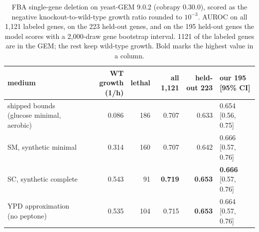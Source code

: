 \begin{table}[H]
  \centering
  \footnotesize
  \caption[FBA essentiality by medium]{FBA single-gene deletion on yeast-GEM 9.0.2 (cobrapy 0.30.0), scored as the negative knockout-to-wild-type growth ratio rounded to $10^{-3}$. AUROC on all 1,121 labeled genes, on the 223 held-out genes, and on the 195 held-out genes the model scores with a 2,000-draw gene bootstrap interval. 1121 of the labeled genes are in the GEM; the rest keep wild-type growth. Bold marks the highest value in a column.}
  \label{tab:fba-media}
  \begin{tabular}{@{}lrrrrl@{}}
    \hline
    medium & WT growth (1/h) & lethal & all 1,121 & held-out 223 & our 195 [95\% CI] \\
    \hline
    shipped bounds (glucose minimal, aerobic) & 0.086 & 186 & 0.707 & 0.633 & 0.654 [0.56, 0.75] \\
    SM, synthetic minimal & 0.314 & 160 & 0.707 & 0.642 & 0.666 [0.57, 0.76] \\
    SC, synthetic complete & 0.543 & 91 & \textbf{0.719} & \textbf{0.653} & \textbf{0.666} [0.57, 0.76] \\
    YPD approximation (no peptone) & 0.535 & 104 & 0.715 & \textbf{0.653} & 0.664 [0.57, 0.76] \\
    \hline
  \end{tabular}
\end{table}
